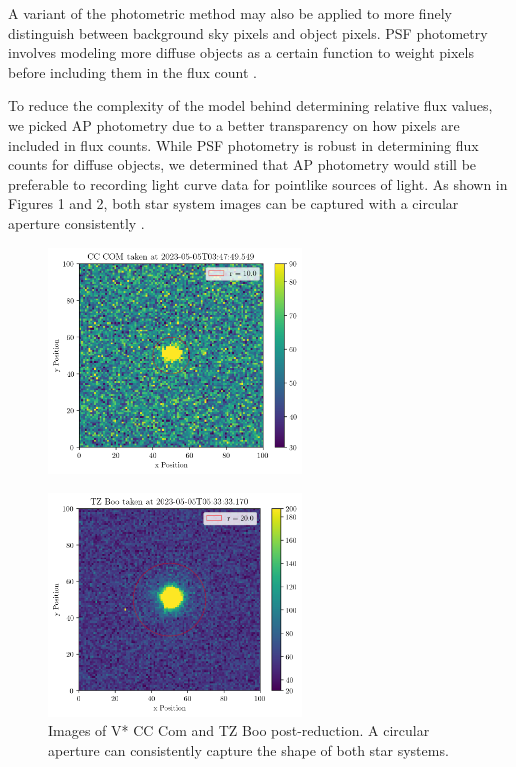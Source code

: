 \documentclass[12pt]{article}
\begin{document}
A  variant of the photometric method may also be applied to more finely distinguish between background sky pixels and object pixels. PSF photometry involves modeling more diffuse objects as a certain function to weight pixels before including them in the flux count \cite{Craig_2021}. 

To reduce the complexity of the model behind determining relative flux values, we picked AP photometry due to a better transparency on how pixels are included in flux counts. While PSF photometry is robust in determining flux counts for diffuse objects, we determined that AP photometry would still be preferable to recording light curve data for pointlike sources of light. As shown in Figures 1 and 2, both star system images can be captured with a circular aperture consistently \cite{Craig_2021}.

\begin{figure}[htpb]
    \begin{center}
       \includegraphics[width=0.6\textwidth]{figures/cc-com_reduced-example.png}
    \end{center}
    \label{fig:ccc-reduced-example}
    \caption{}
\end{figure}
\begin{figure}[htpb]
    \begin{center}
        \includegraphics[width=0.6\textwidth]{figures/tz-boo_reduced-example.png}
    \end{center}
    \label{fig:tzb-reduced-example}
    \caption{Images of V* CC Com and TZ Boo post-reduction. A circular aperture can consistently capture the shape of both star systems.}
\end{figure}
\end{document}
